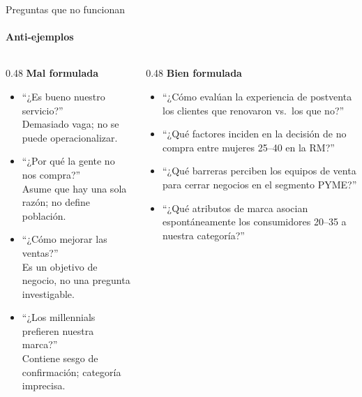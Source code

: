 \documentclass[aspectratio=169, 12pt]{beamer}
\begin{document}
\begin{frame}{Preguntas que no funcionan}
  \framesubtitle{Anti-ejemplos}
  \small
  \begin{columns}[T]
    \begin{column}{0.48\textwidth}
      \textbf{\color{daMagenta}Mal formulada}
      \begin{itemize}
        \item ``¿Es bueno nuestro servicio?''\\
              {\color{daTextMid}\tiny Demasiado vaga; no se puede operacionalizar.}
        \item ``¿Por qué la gente no nos compra?''\\
              {\color{daTextMid}\tiny Asume que hay una sola razón; no define población.}
        \item ``¿Cómo mejorar las ventas?''\\
              {\color{daTextMid}\tiny Es un objetivo de negocio, no una pregunta investigable.}
        \item ``¿Los millennials prefieren nuestra marca?''\\
              {\color{daTextMid}\tiny Contiene sesgo de confirmación; categoría imprecisa.}
      \end{itemize}
    \end{column}
    \begin{column}{0.48\textwidth}
      \textbf{\color{daPurpleLight}Bien formulada}
      \begin{itemize}
        \item ``¿Cómo evalúan la experiencia de postventa los clientes que renovaron vs.\ los que no?''
        \item ``¿Qué factores inciden en la decisión de no compra entre mujeres 25--40 en la RM?''
        \item ``¿Qué barreras perciben los equipos de venta para cerrar negocios en el segmento PYME?''
        \item ``¿Qué atributos de marca asocian espontáneamente los consumidores 20--35 a nuestra categoría?''
      \end{itemize}
    \end{column}
  \end{columns}
\end{frame}
\end{document}
